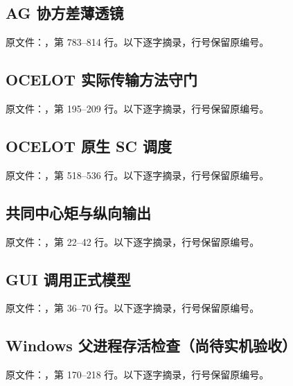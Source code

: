 \subsection{AG 协方差薄透镜}\label{code:rfag}
\noindent 原文件：，第 783--814 行。以下逐字摘录，行号保留原编号。

\subsection{OCELOT 实际传输方法守门}\label{code:method}
\noindent 原文件：，第 195--209 行。以下逐字摘录，行号保留原编号。

\subsection{OCELOT 原生 SC 调度}\label{code:schedule}
\noindent 原文件：，第 518--536 行。以下逐字摘录，行号保留原编号。

\subsection{共同中心矩与纵向输出}\label{code:diagnostic}
\noindent 原文件：，第 22--42 行。以下逐字摘录，行号保留原编号。

\subsection{GUI 调用正式模型}\label{code:worker}
\noindent 原文件：，第 36--70 行。以下逐字摘录，行号保留原编号。

\subsection{Windows 父进程存活检查（尚待实机验收）}\label{code:platform}
\noindent 原文件：，第 170--218 行。以下逐字摘录，行号保留原编号。
